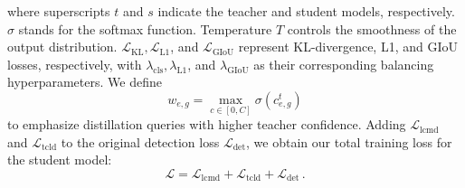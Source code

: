 \noindent where superscripts $t$ and $s$ indicate the teacher and student models, respectively. $\sigma$ stands for the softmax function. Temperature $T$ controls the smoothness of the output distribution. $\mathcal{L}_{\text{KL}}, \mathcal{L}_{\text{L1}}$, and $\mathcal{L}_{\text{GIoU}}$ represent KL-divergence, L1, and GIoU losses, respectively, with $\lambda_{\text{cls}}, \lambda_{\text{L1}}$, and $\lambda_{\text{GIoU}}$ as their corresponding balancing hyperparameters. We define
\begin{equation}
    w_{e,g} = \max_{c \in [0, C]} \sigma (c^t_{e,g})
\end{equation}
\noindent to emphasize distillation queries with higher teacher confidence. 
Adding $\mathcal{L}_{\text{lcmd}}$ and $\mathcal{L}_{\text{tcld}}$ to the original detection loss $\mathcal{L}_{\text{det}}$, we obtain our total training loss for the student model:
\begin{equation}
    \mathcal{L} = \mathcal{L}_{\text{lcmd}} + \mathcal{L}_{\text{tcld}} + \mathcal{L}_{\text{det}} \,.
\end{equation}
